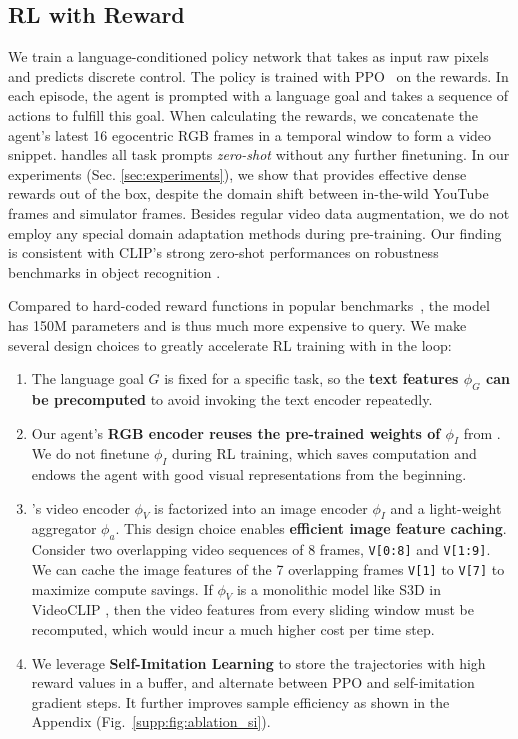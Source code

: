 \subsection{RL with \mineclip Reward}
\label{sec:method-rl}

We train a language-conditioned policy network that takes as input raw pixels and predicts discrete control. The policy is trained with PPO~\cite{schulman2017proximal} on the \mineclip rewards.
In each episode, the agent is prompted with a language goal and takes a sequence of actions to fulfill this goal. When calculating the \mineclip rewards, we concatenate the agent's latest 16 egocentric RGB frames in a temporal window to form a video snippet. \mineclip handles all task prompts \textit{zero-shot} without any further finetuning. In our experiments (Sec. \ref{sec:experiments}), we show that \mineclip provides effective dense rewards out of the box, despite the domain shift between in-the-wild YouTube frames and simulator frames. Besides regular video data augmentation, we do not employ any special domain adaptation methods during pre-training. Our finding is consistent with CLIP's strong zero-shot performances on robustness benchmarks in object recognition \cite{radford2021clip}. 

Compared to hard-coded reward functions in popular benchmarks~\cite{zhu2020robosuite,tassa2018deepmind,fan2021secant}, the \mineclip model has 150M parameters and is thus much more expensive to query. We make several design choices to greatly accelerate RL training with \mineclip in the loop:  

\begin{enumerate}[leftmargin=3em]
    \item The language goal $G$ is fixed for a specific task, so the \textbf{text features $\phi_G$ can be precomputed} to avoid invoking the text encoder repeatedly. 
    \item Our agent's \textbf{RGB encoder reuses the pre-trained weights of $\phi_I$} from \mineclip. We do not finetune $\phi_I$ during RL training, which saves computation and endows the agent with good visual representations from the beginning. 
    \item \mineclip's video encoder $\phi_V$ is factorized into an image encoder $\phi_I$ and a light-weight aggregator $\phi_a$.  This design choice enables \textbf{efficient image feature caching}. Consider two overlapping video sequences of 8 frames, \texttt{V[0:8]} and \texttt{V[1:9]}.
    We can cache the image features of the 7 overlapping frames \texttt{V[1]} to \texttt{V[7]} to maximize compute savings.
    If $\phi_V$ is a monolithic model like S3D \cite{xie2018rethinking} in VideoCLIP \cite{xu2021videoclip}, then the video features from every sliding window must be recomputed, which would incur a much higher cost per time step.
    \item We leverage \textbf{Self-Imitation Learning} \cite{oh2018self} to store the trajectories with high \mineclip reward values in a buffer, and alternate between PPO and self-imitation gradient steps. It further improves sample efficiency as shown in the Appendix (Fig.~\ref{supp:fig:ablation_si}). 
\end{enumerate}




